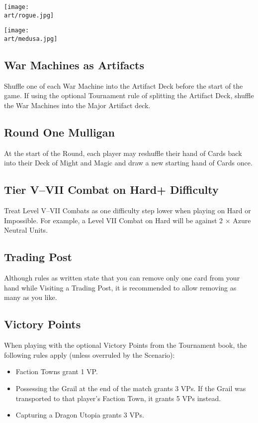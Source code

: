\begin{multicols*}{2}
\texttt{[image: \\art/rogue.jpg]}

\texttt{[image: \\art/medusa.jpg]}

\subsection*{War Machines as Artifacts}

Shuffle one of each War Machine into the Artifact Deck before the start of the game.
If using the optional Tournament rule of splitting the Artifact Deck, shuffle the War Machines into the Major Artifact deck.

\subsection*{Round One Mulligan}

At the start of the  Round, each player may reshuffle their hand of Cards back into their Deck of Might and Magic and draw a new starting hand of Cards once.

\subsection*{Tier V--VII Combat on Hard+ Difficulty}

Treat Level V--VII Combats as one difficulty step lower when playing on Hard or Impossible.
For example, a Level VII Combat on Hard will be against 2 × Azure Neutral Units.

\subsection*{Trading Post}

Although rules as written state that you can remove only one card from your hand while Visiting a Trading Post, it is recommended to allow removing as many as you like.

\subsection*{Victory Points}

When playing with the optional Victory Points from the Tournament book, the following rules apply (unless overruled by the Scenario):
\begin{itemize}
  \item Faction Towns grant 1 VP.
  \item Possessing the Grail at the end of the match grants 3 VPs. If the Grail was transported to that player's Faction Town, it grants 5 VPs instead.
  \item Capturing a Dragon Utopia grants 3 VPs.
\end{itemize}

\end{multicols*}

